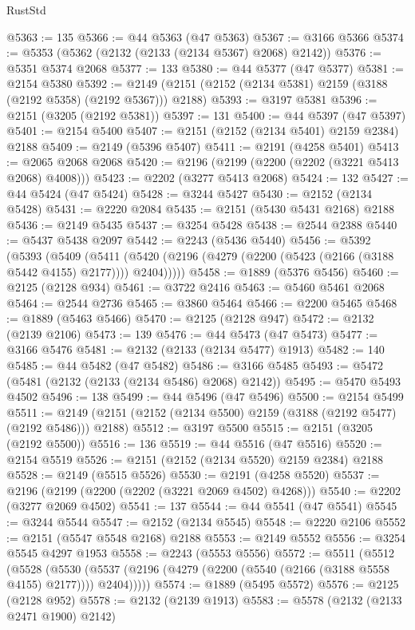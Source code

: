 \begin{lexlean}{RustStd}
\begin{coremodule}
@5363 := 135
@5366 := @44 @5363 (@47 @5363)
@5367 := @3166 @5366
@5374 := @5353 (@5362 (@2132 (@2133 (@2134 @5367) @2068) @2142))
@5376 := @5351 @5374 @2068
@5377 := 133
@5380 := @44 @5377 (@47 @5377)
@5381 := @2154 @5380
@5392 := @2149 (@2151 (@2152 (@2134 @5381) @2159 (@3188 (@2192 @5358) (@2192 @5367))) @2188)
@5393 := @3197 @5381
@5396 := @2151 (@3205 (@2192 @5381))
@5397 := 131
@5400 := @44 @5397 (@47 @5397)
@5401 := @2154 @5400
@5407 := @2151 (@2152 (@2134 @5401) @2159 @2384) @2188
@5409 := @2149 (@5396 @5407)
@5411 := @2191 (@4258 @5401)
@5413 := @2065 @2068 @2068
@5420 := @2196 (@2199 (@2200 (@2202 (@3221 @5413 @2068) @4008)))
@5423 := @2202 (@3277 @5413 @2068)
@5424 := 132
@5427 := @44 @5424 (@47 @5424)
@5428 := @3244 @5427
@5430 := @2152 (@2134 @5428)
@5431 := @2220 @2084
@5435 := @2151 (@5430 @5431 @2168) @2188
@5436 := @2149 @5435
@5437 := @3254 @5428
@5438 := @2544 @2388
@5440 := @5437 @5438 @2097
@5442 := @2243 (@5436 @5440)
@5456 := @5392
    (@5393
      (@5409
        (@5411 (@5420 (@2196 (@4279 (@2200 (@5423 (@2166 (@3188 @5442 @4155) @2177)))) @2404)))))
@5458 := @1889 (@5376 @5456)
@5460 := @2125 (@2128 @934)
@5461 := @3722 @2416
@5463 := @5460 @5461 @2068
@5464 := @2544 @2736
@5465 := @3860 @5464
@5466 := @2200 @5465
@5468 := @1889 (@5463 @5466)
@5470 := @2125 (@2128 @947)
@5472 := @2132 (@2139 @2106)
@5473 := 139
@5476 := @44 @5473 (@47 @5473)
@5477 := @3166 @5476
@5481 := @2132 (@2133 (@2134 @5477) @1913)
@5482 := 140
@5485 := @44 @5482 (@47 @5482)
@5486 := @3166 @5485
@5493 := @5472 (@5481 (@2132 (@2133 (@2134 @5486) @2068) @2142))
@5495 := @5470 @5493 @4502
@5496 := 138
@5499 := @44 @5496 (@47 @5496)
@5500 := @2154 @5499
@5511 := @2149 (@2151 (@2152 (@2134 @5500) @2159 (@3188 (@2192 @5477) (@2192 @5486))) @2188)
@5512 := @3197 @5500
@5515 := @2151 (@3205 (@2192 @5500))
@5516 := 136
@5519 := @44 @5516 (@47 @5516)
@5520 := @2154 @5519
@5526 := @2151 (@2152 (@2134 @5520) @2159 @2384) @2188
@5528 := @2149 (@5515 @5526)
@5530 := @2191 (@4258 @5520)
@5537 := @2196 (@2199 (@2200 (@2202 (@3221 @2069 @4502) @4268)))
@5540 := @2202 (@3277 @2069 @4502)
@5541 := 137
@5544 := @44 @5541 (@47 @5541)
@5545 := @3244 @5544
@5547 := @2152 (@2134 @5545)
@5548 := @2220 @2106
@5552 := @2151 (@5547 @5548 @2168) @2188
@5553 := @2149 @5552
@5556 := @3254 @5545 @4297 @1953
@5558 := @2243 (@5553 @5556)
@5572 := @5511
    (@5512
      (@5528
        (@5530 (@5537 (@2196 (@4279 (@2200 (@5540 (@2166 (@3188 @5558 @4155) @2177)))) @2404)))))
@5574 := @1889 (@5495 @5572)
@5576 := @2125 (@2128 @952)
@5578 := @2132 (@2139 @1913)
@5583 := @5578 (@2132 (@2133 @2471 @1900) @2142)

\end{coremodule}
\end{lexlean}
